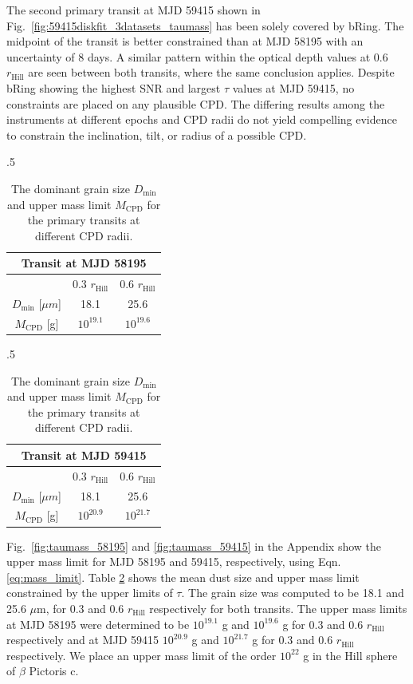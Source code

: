 \documentclass{aa}
\newcommand\picc{$\beta$ Pictoris c}
\begin{document}
	The second primary transit at MJD 59415 shown in Fig.~\ref{fig:59415diskfit_3datasets_taumass} has been solely covered by bRing.
	The midpoint of the transit is better constrained than at MJD 58195 with an uncertainty of 8 days.
	A similar pattern within the optical depth values at 0.6 $r_{\text{Hill}}$ are seen between both transits, where the same conclusion applies. 
	Despite bRing showing the highest SNR and largest $\tau$ values at MJD 59415, no constraints are placed on any plausible CPD.
	The differing results among the instruments at different epochs and CPD radii do not yield compelling evidence to constrain the inclination, tilt, or radius of a possible CPD.
	
	\begin{table}[h!] 
		\caption{The dominant grain size $D_{\text{min}}$ and upper mass limit $M_{\text{CPD}}$ for the primary transits at different CPD radii.}
		\begin{subtable}{.5\linewidth}
			\centering
			\begin{tabular}{ccc}
				\hline
				\multicolumn{3}{c}{Transit at MJD 58195 } \\
				\hline
				\hline
				& 0.3 $r_{\text{Hill}}$ & 0.6 $r_{\text{Hill}}$\\
				\hline
				\hline
				$D_{\text{min}}$  [$\mu m$]  & 18.1    &25.6\\
				$M_{\text{CPD}}$ [g]&   $10^{19.1}$  & $10^{19.6}$ \\
				\hline
			\end{tabular}
		\end{subtable}%
		\begin{subtable}{.5\linewidth}
			\centering
			
			\begin{tabular}{ccc}
				\hline
				\multicolumn{3}{c}{Transit at MJD 59415} \\
				\hline
				\hline
				& 0.3 $r_{\text{Hill}}$ & 0.6 $r_{\text{Hill}}$\\
				\hline
				$D_{\text{min}}$ [$\mu m$]  & 18.1    & 25.6\\
				$M_{\text{CPD}}$ [g]&   $10^{20.9}$  & $10^{21.7}$ \\
				\hline
			\end{tabular}
		\end{subtable} 
		\label{tab:uppermass}
	\end{table} 
	
	Fig.~\ref{fig:taumass_58195} and \ref{fig:taumass_59415} in the Appendix show the upper mass limit for MJD 58195 and 59415, respectively, using Eqn. \ref{eq:mass_limit}.
	Table \ref{tab:uppermass} shows the mean dust size and upper mass limit constrained by the upper limits of $\tau$.
	The grain size was computed to be 18.1 and 25.6 $\mu$m, for 0.3 and 0.6 $r_{\text{Hill}}$ respectively for both transits. 
	The upper mass limits at MJD 58195 were determined to be $10^{19.1} $ g and $10^{19.6}$ g for 0.3 and 0.6 
	$r_{\text{Hill}}$ respectively and at MJD 59415 $10^{20.9}$ g and $10^{21.7}$ g for 0.3 and 0.6 $r_{\text{Hill}}$ respectively.
	We place an upper mass limit of the order $10^{22}$ g in the Hill sphere of \picc{}.
	
\end{document}

